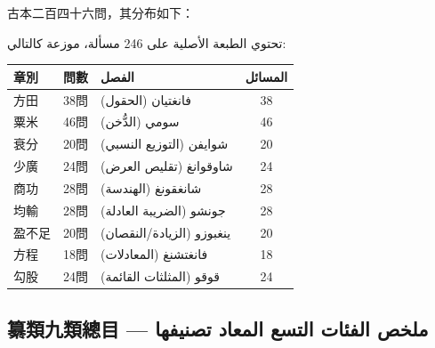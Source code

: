 \documentclass[11pt,a4paper]{article}
\newcommand{\ar}[1]{\arabicfont\beginR #1\endR}
\newcommand{\ChinCol}[1]{\begin{minipage}[t]{0.48\textwidth}#1\end{minipage}}
\newcommand{\ArabCol}[1]{\begin{minipage}[t]{0.48\textwidth}\arabicfont\beginR #1\endR\end{minipage}}
\newcommand{\parallelsection}[2]{%
  \noindent\ChinCol{#1}\hfill\ArabCol{#2}\par\vspace{0.5cm}%
}
\begin{document}
\parallelsection{%
古本二百四十六問，其分布如下：
}{%
تحتوي الطبعة الأصلية على 246 مسألة، موزعة كالتالي:
}

\begin{center}
\small
\begin{tabular}{|l|c|l|c|}
\hline
\textbf{章別} & \textbf{問數} & \textbf{\ar{الفصل}} & \textbf{\ar{المسائل}} \\
\hline
方田 & 38問 & \ar{فانغتيان (الحقول)} & 38 \\
粟米 & 46問 & \ar{سومي (الدُّخن)} & 46 \\
衰分 & 20問 & \ar{شوايفن (التوزيع النسبي)} & 20 \\
少廣 & 24問 & \ar{شاوقوانغ (تقليص العرض)} & 24 \\
商功 & 28問 & \ar{شانغقونغ (الهندسة)} & 28 \\
均輸 & 28問 & \ar{جونشو (الضريبة العادلة)} & 28 \\
盈不足 & 20問 & \ar{ينغبوزو (الزيادة/النقصان)} & 20 \\
方程 & 18問 & \ar{فانغتشنغ (المعادلات)} & 18 \\
勾股 & 24問 & \ar{قوقو (المثلثات القائمة)} & 24 \\
\hline
\end{tabular}
\end{center}

\subsection*{纂類九類總目 --- \ar{ملخص الفئات التسع المعاد تصنيفها}}
\end{document}
